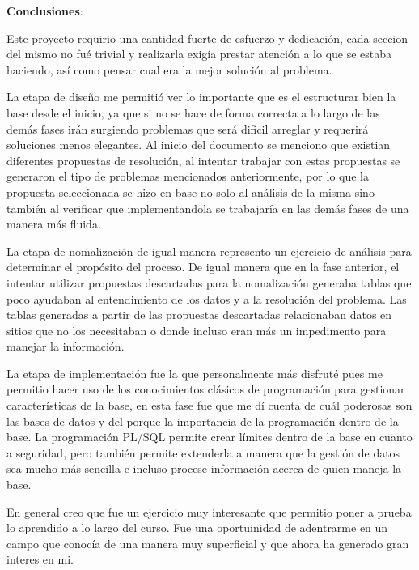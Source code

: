 \documentclass[12pt, letterpaper]{article}     %
\begin{document}
		\vspace{5mm} %
		\textbf{Conclusiones}:
		\vspace{5mm} %
		
		Este proyecto requirio una cantidad fuerte de esfuerzo y dedicación, cada seccion del mismo no fué trivial y realizarla exigía prestar atención a lo que se estaba haciendo, así como pensar cual era la mejor solución al problema.
		
		La etapa de diseño me permitió ver lo importante que es el estructurar bien la base desde el inicio, ya que si no se hace de forma correcta a lo largo de las demás fases irán surgiendo problemas que será dificil arreglar y requerirá soluciones menos elegantes. Al inicio del documento se menciono que existian diferentes propuestas de resolución, al intentar trabajar con estas propuestas se generaron el tipo de problemas mencionados anteriormente, por lo que la propuesta seleccionada se hizo en base no solo al análisis de la misma sino también al verificar que implementandola se trabajaría en las demás fases de una manera más fluida.
		
		La etapa de nomalización de igual manera represento un ejercicio de análisis para determinar el propósito del proceso. De igual manera que en la fase anterior, el intentar utilizar propuestas descartadas para la nomalización generaba tablas que poco ayudaban al entendimiento de los datos y a la resolución del problema. Las tablas generadas a partir de las propuestas descartadas relacionaban datos en sitios que no los necesitaban o donde incluso eran más un impedimento para manejar la información.
		
		La etapa de implementación fue la que personalmente más disfruté pues me permitio hacer uso de los conocimientos clásicos de programación para gestionar características de la base, en esta fase fue que me dí cuenta de cuál poderosas son las bases de datos y del porque la importancia de la programación dentro de la base. La programación PL/SQL permite crear límites dentro de la base en cuanto a seguridad, pero también permite extenderla a manera que la gestión de datos sea mucho más sencilla e incluso procese información acerca de quien maneja la base.
		
		En general creo que fue un ejercicio muy interesante que permitio poner a prueba lo aprendido a lo largo del curso. Fue una oportuinidad de adentrarme en un campo que conocía de una manera muy superficial y que ahora ha generado gran interes en mi.		
		
		
\end{document}
